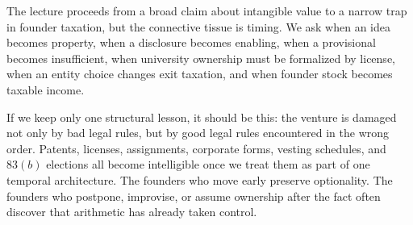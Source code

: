 The lecture proceeds from a broad claim about intangible value to a narrow trap in founder taxation, but the connective tissue is timing. We ask when an idea becomes property, when a disclosure becomes enabling, when a provisional becomes insufficient, when university ownership must be formalized by license, when an entity choice changes exit taxation, and when founder stock becomes taxable income.

If we keep only one structural lesson, it should be this: the venture is damaged not only by bad legal rules, but by good legal rules encountered in the wrong order. Patents, licenses, assignments, corporate forms, vesting schedules, and \(83(b)\) elections all become intelligible once we treat them as part of one temporal architecture. The founders who move early preserve optionality. The founders who postpone, improvise, or assume ownership after the fact often discover that arithmetic has already taken control.